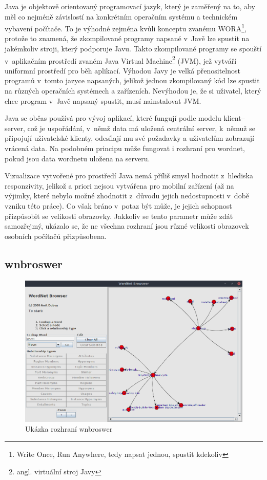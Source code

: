 \documentclass[a4paper, 11pt, oneside, showtrims]{book}
\begin{document}
				Java je objektově orientovaný programovací jazyk, který je zaměřený na to, aby měl co nejméně závislostí na konkrétním operačním systému a technickém vybavení počítače. To je výhodné zejména kvůli konceptu zvanému WORA\footnote{Write Once, Run Anywhere, tedy napsat jednou, spustit kdekoliv}, protože to znamená, že zkompilované programy napsané v~Javě lze spustit na jakémkoliv stroji, který podporuje Javu. Takto zkompilované programy se spouští v~aplikačním prostředí zvaném Java Virtual Machine\footnote{angl. virtuální stroj Javy} (JVM), jež vytváří uniformní prostředí pro běh aplikací. Výhodou Javy je velká přenositelnost programů v~tomto jazyce napsaných, jelikož jednou zkompilovaný kód lze spustit na různých operačních systémech a zařízeních. Nevýhodou je, že si uživatel, který chce program v~Javě napsaný spustit, musí nainstalovat JVM. 

				Java se občas používá pro vývoj aplikací, které fungují podle modelu klient--server, což je uspořádání, v~němž data má uložená centrální server, k~němuž se připojují uživatelské klienty, odesílají mu své požadavky a uživatelům zobrazují vrácená data. \parencite[13]{gosling1995java} Na podobném principu může fungovat i rozhraní pro wordnet, pokud jsou data wordnetu uložena na serveru.

				Vizualizace vytvořené pro prostředí Java nemá příliš smysl hodnotit z~hlediska responzivity, jelikož a priori nejsou vytvářena pro mobilní zařízení (až na výjimky, které nebylo možné zhodnotit z~důvodu jejich nedostupnosti v~době vzniku této práce). Co však bráno v~potaz být může, je jejich schopnost přizpůsobit se velikosti obrazovky. Jakkoliv se tento parametr může zdát samozřejmý, ukázalo se, že ne všechna rozhraní jsou různé velikosti obrazovek osobních počítačů přizpůsobena.

				\subsection{wnbroswer}

					\begin{figure}[h]
						\centering
						\includegraphics[width=1.0\textwidth]{wnwordnetbrowswer.png}
						\caption{Ukázka rozhraní wnbroswer}
						\label{fig:wnwordnetbrowswer}
					\end{figure}
\end{document}
